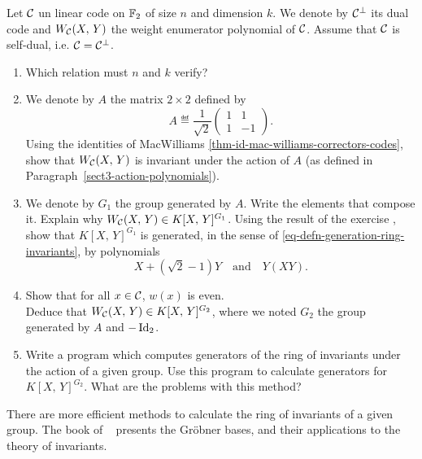  
\begin{exo}
\label{exo-codes-autoduaux}
 
     Let $ \mathcal{C} $ un linear code on $ \mathbb{F}_2 $ of size $ n $ and dimension $ k $. We denote by $ \mathcal{C}^\bot $ its dual code and $ W_{\mathcal{C}} (X, \, Y) $ the weight enumerator polynomial of $ \mathcal{C} $. Assume that $ \mathcal{C} $ is self-dual, i.e. $ \mathcal{C} = \mathcal{C}^\bot $. \begin{enumerate}
\item Which relation must $ n $ and $ k $ verify?
\item We denote by $ A $ the matrix $ 2 \times 2 $ defined by
\begin{equation*}
A \eqdef \frac{1}{\sqrt{2}} \begin{pmatrix} 1 & 1 \\1 & -1 \end{pmatrix}.
\end{equation*}
Using the identities of MacWilliams \ref{thm-id-mac-williams-correctors-codes}, show that $ W_{\mathcal{C}} (X, \, Y) $ is invariant under the action of $ A $ (as defined in Paragraph~\ref{sect3-action-polynomials}).
\item We denote by $ G_1 $ the group generated by $ A $. Write the elements that compose it. Explain why $ W_{\mathcal{C}} (X, \, Y) \in K [X, \, Y]^{G_1} $. Using the result of the exercise , show that $ K [X, \, Y]^{G_1} $ is generated, in the sense of \eqref{eq-defn-generation-ring-invariants}, by polynomials
\begin{equation*}
X + (\sqrt{2} -1) Y \quad \text{and} \quad Y (XY).
\end{equation*}
 
\item Show that for all $ x \in \mathcal{C} $, $ w (x) $ is even. \\Deduce that $ W_{\mathcal{C}} (X, \, Y) \in K [X, \, Y]^{G_2} $, where we noted $ G_2 $ the group generated by $ A $ and $ - \operatorname{Id}_2 $.
\item Write a program \Maple{} which computes generators of the ring of invariants under the action of a given group. Use this program to calculate generators for $ K [X, \, Y]^{G_2} $. What are the problems with this method?
\end{enumerate}  There are more efficient methods to calculate the ring of invariants of a given group. The book of ~\cite{cox} presents the Gröbner bases, and their applications to the theory of invariants.
\end{exo}
 
 
 
 

